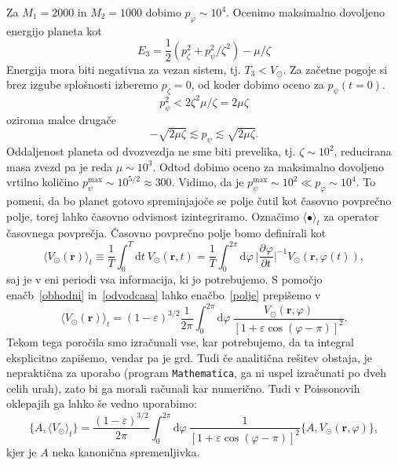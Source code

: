 \documentclass[12pt, a4paper]{article}
\renewcommand{\r}{
    \ensuremath{\mathbf{r}}
}
\newcommand{\der}[3][]{
    \ensuremath{ \frac{\partial^{#1} #2}{\partial #3^{#1}} }
}
\renewcommand{\d}{
    \ensuremath{\mathrm{d}}
}
\begin{document}
Za $M_1 = 2000$ in $M_2 = 1000$ dobimo $p_\varphi \sim 10^4$. Ocenimo maksimalno dovoljeno energijo
planeta kot
\begin{equation}
	E_3 = \frac{1}{2}(p^2_\zeta + p_\psi^2/\zeta^2) - \mu/\zeta
\end{equation}
Energija mora biti negativna za vezan sistem, tj. $T_3 < V_\odot$. Za za\v cetne pogoje si brez izgube
splo\v snosti izberemo $p_\zeta = 0$, od koder dobimo oceno za $p_\psi(t = 0)$.
\[
	p_\psi^2 < 2\zeta^2 \mu/\zeta = 2\mu\zeta
\]
oziroma malce druga\v ce
\begin{equation}
	-\sqrt{2\mu\zeta} \lesssim p_\psi \lesssim \sqrt{2\mu\zeta}.
\end{equation}
Oddaljenost planeta od dvozvezdja ne sme biti prevelika, tj. $\zeta \sim 10^2$, reducirana masa zvezd pa je
reda $\mu \sim 10^3$. Odtod dobimo oceno za maksimalno dovoljeno vrtilno koli\v cino $p_\psi^\text{max}
\sim 10^{5/2} \approx 300$. Vidimo, da je $p_\psi^\text{max} \sim 10^2 \ll p_\varphi \sim 10^4$. To pomeni,
da bo planet gotovo spreminjajo\v ce se polje \v cutil kot \v casovno povpre\v cno polje, torej lahko
\v casovno odvisnost izintegriramo. Ozna\v cimo $\langle \bullet \rangle_t$ za operator \v casovnega povpre\v cja.
\v Casovno povpre\v cno polje bomo definirali kot
\begin{equation}
	\langle V_\odot(\r)\rangle_t \equiv \frac{1}{T}\int_0^T \d t\ V_\odot (\r,t) = \frac{1}{T}\int_0^{2\pi}\d \varphi\
		\bigg|\der{\varphi}{t}\bigg|^{-1} V_\odot(\r, \varphi(t)),
	\label{polje}
\end{equation}
saj je v eni periodi vsa informacija, ki jo potrebujemo. S pomo\v cjo ena\v cb~\eqref{obhodni} in~\eqref{odvodcasa}
lahko ena\v cbo~\eqref{polje} prepi\v semo v
\begin{equation}
	\langle V_\odot(\r)\rangle_t = (1 - \varepsilon)^{3/2} \frac{1}{2\pi}\int_0^{2\pi} \d \varphi\
		\frac{V_\odot(\r,\varphi)}{[1 + \varepsilon\cos(\varphi - \pi)]^2}.
\end{equation}
Tekom tega poro\v cila smo izra\v cunali vse, kar potrebujemo, da ta integral eksplicitno zapi\v semo, vendar
pa je grd. Tudi \v ce analiti\v cna re\v sitev obstaja, je neprakti\v cna za uporabo (program {\tt Mathematica},
ga ni uspel izra\v cunati po dveh celih urah), zato bi ga morali ra\v cunali kar numeri\v cno. Tudi v Poissonovih
oklepajih ga lahko \v se vedno uporabimo:
\begin{equation}
	\big\{A,\langle V_\odot\rangle_t\big\} = \frac{(1 - \varepsilon)^{3/2}}{2\pi}\int_0^{2\pi}\d \varphi\
		\frac{1}{[1 + \varepsilon\cos(\varphi - \pi)]^2}\{A, V_\odot(\r,\varphi)\},
\end{equation}
kjer je $A$ neka kanoni\v cna spremenljivka. 
\end{document}
